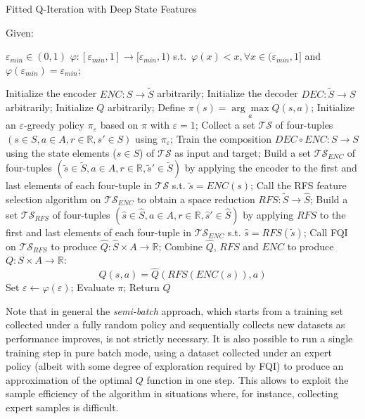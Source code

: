 \begin{algorithm}
    \caption{Fitted Q-Iteration with Deep State Features}
    \label{alg:FQI-DSDF}
    \begin{algorithmic}
	\STATE Given: 
	    \begin{ALC@g}
	        \STATE $\varepsilon_{min} \in (0, 1)$
	        \STATE $\varphi: [\varepsilon_{min}, 1] \rightarrow [\varepsilon_{min}, 1)$ s.t.\ $\varphi(x) < x, \forall x \in (\varepsilon_{min}, 1]$ and $\varphi(\varepsilon_{min}) = \varepsilon_{min}$;
	    \end{ALC@g}
	\STATE Initialize the encoder $ENC: S \rightarrow \tilde{S}$ arbitrarily;
	\STATE Initialize the decoder $DEC: \tilde{S} \rightarrow S$ arbitrarily;
	\STATE Initialize $Q$ arbitrarily;
	\STATE Define $\pi(s) = \underset{a}{\arg\max} Q(s, a)$;
	\STATE Initialize an $\varepsilon$-greedy policy $\pi_\varepsilon$ based on $\pi$ with $\varepsilon = 1$;
	\REPEAT 
	    \STATE Collect a set $\mathcal{TS}$ of four-tuples $(s \in S, a \in A, r \in \mathbb{R}, s' \in S)$ using $\pi_\varepsilon$;
	    \STATE Train the composition $DEC \circ ENC: S \rightarrow S$ using the state elements ($s \in S$) of $\mathcal{TS}$ as input and target;
	    \STATE Build a set $\mathcal{TS}_{ENC}$ of four-tuples $(\tilde{s} \in \tilde{S}, a \in A, r \in \mathbb{R}, \tilde{s}' \in \tilde{S})$ by applying the encoder to the first and last elements of each four-tuple in $\mathcal{TS}$ s.t. $\tilde{s} = ENC(s)$;
	    \STATE Call the RFS feature selection algorithm on $\mathcal{TS}_{ENC}$ to obtain a space reduction $RFS: \tilde{S} \rightarrow \hat{S}$;
	    \STATE Build a set $\mathcal{TS}_{RFS}$ of four-tuples $(\hat{s} \in \hat{S}, a \in A, r \in \mathbb{R}, \hat{s}' \in \hat{S})$ by applying $RFS$ to the first and last elements of each four-tuple in $\mathcal{TS}_{ENC}$ s.t. $\hat{s} = RFS(\tilde{s})$;
	    \STATE Call FQI on $\mathcal{TS}_{RFS}$ to produce $\hat{Q}: \hat{S} \times A \rightarrow \mathbb{R}$;
	    \STATE Combine $\hat{Q}$, $RFS$ and $ENC$ to produce $Q: S \times A \rightarrow \mathbb{R}$:
		\[
		    Q(s, a) = \hat{Q}(RFS(ENC(s)), a)
		\]
	    \STATE Set $\varepsilon \leftarrow \varphi(\varepsilon)$;
	    \STATE Evaluate $\pi$; 
	\STATE Return $Q$
    \end{algorithmic}
\end{algorithm}
%

Note that in general the \textit{semi-batch} approach, which starts from a 
training set collected under a fully random policy and sequentially collects new
datasets as performance improves, is not strictly necessary. It is also possible
to run a single training step in pure batch mode, using a dataset collected 
under an expert policy (albeit with some degree of exploration required by FQI) 
to produce an approximation of the optimal $Q$ function in one step. 
This allows to exploit the sample efficiency of the algorithm in situations 
where, for instance, collecting expert samples is difficult.

